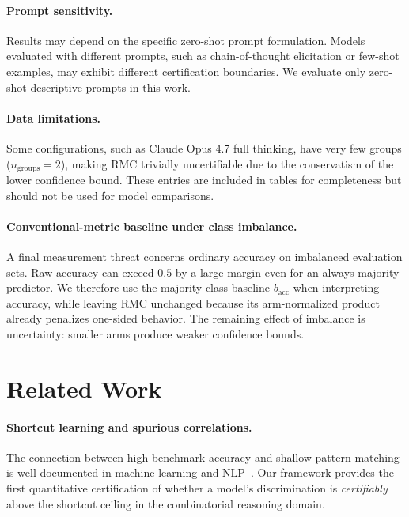 \documentclass[conference]{IEEEtran}
\theoremstyle{remark}
\newcommand{\accBase}{b_{\mathrm{acc}}}
\begin{document}
\paragraph{Prompt sensitivity.}
Results may depend on the specific zero-shot prompt formulation.
Models evaluated with different prompts, such as chain-of-thought elicitation or few-shot examples, may exhibit different certification boundaries.
We evaluate only zero-shot descriptive prompts in this work.

\paragraph{Data limitations.}
Some configurations, such as Claude Opus 4.7 full thinking, have very few groups ($n_{\mathrm{groups}}=2$), making RMC trivially uncertifiable due to the conservatism of the lower confidence bound.
These entries are included in tables for completeness but should not be used for model comparisons.


\paragraph{Conventional-metric baseline under class imbalance.}
A final measurement threat concerns ordinary accuracy on imbalanced evaluation sets.  Raw accuracy can exceed $0.5$ by a large margin even for an always-majority predictor.  We therefore use the majority-class baseline $\accBase$ when interpreting accuracy, while leaving RMC unchanged because its arm-normalized product already penalizes one-sided behavior.  The remaining effect of imbalance is uncertainty: smaller arms produce weaker confidence bounds.

\section{Related Work}
\label{sec:related}

\paragraph{Shortcut learning and spurious correlations.}
The connection between high benchmark accuracy and shallow pattern matching is well-documented in machine learning and NLP~\cite{geirhos2020shortcut,gururangan2018annotation,mccoy2019right,niven2019probing}.
Our framework provides the first quantitative certification of whether a model's discrimination is \emph{certifiably} above the shortcut ceiling in the combinatorial reasoning domain.
\end{document}
